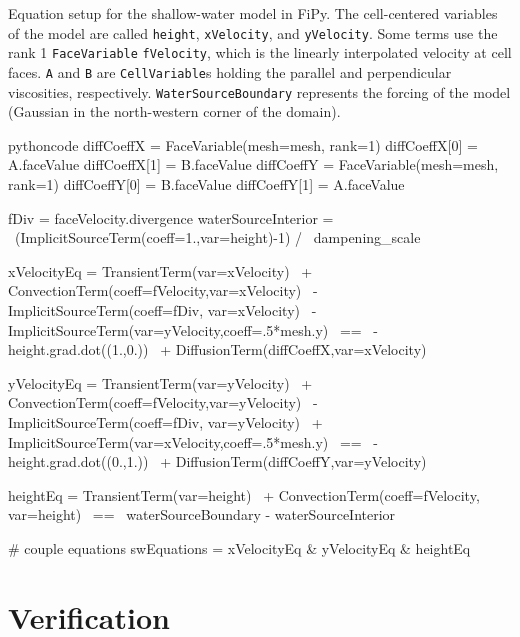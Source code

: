 \begin{listing}[p]
	\caption[Equation setup for the shallow-water model in FiPy.]{Equation setup for the shallow-water model in FiPy. The cell-centered variables of the model are called \texttt{height}, \texttt{xVelocity}, and \texttt{yVelocity}. Some terms use the rank 1 \texttt{FaceVariable} \texttt{fVelocity}, which is the linearly interpolated velocity at cell faces. \texttt{A} and \texttt{B} are \texttt{CellVariable}s holding the parallel and perpendicular viscosities, respectively. \texttt{WaterSourceBoundary} represents the forcing of the model (Gaussian in the north-western corner of the domain).}
	\label{lst:fipy-equations}
		\begin{listingsbox}{pythoncode}
			diffCoeffX = FaceVariable(mesh=mesh, rank=1)
			diffCoeffX[0] = A.faceValue
			diffCoeffX[1] = B.faceValue
			diffCoeffY = FaceVariable(mesh=mesh, rank=1)
			diffCoeffY[0] = B.faceValue
			diffCoeffY[1] = A.faceValue

			fDiv = faceVelocity.divergence
			waterSourceInterior = \
			  (ImplicitSourceTerm(coeff=1.,var=height)-1) / \
			  dampening_scale

			xVelocityEq = TransientTerm(var=xVelocity) \
			+ ConvectionTerm(coeff=fVelocity,var=xVelocity) \
			- ImplicitSourceTerm(coeff=fDiv, var=xVelocity) \
			- ImplicitSourceTerm(var=yVelocity,coeff=.5*mesh.y) \
			== \
			- height.grad.dot((1.,0.)) \
			+ DiffusionTerm(diffCoeffX,var=xVelocity)

			yVelocityEq = TransientTerm(var=yVelocity) \
			+ ConvectionTerm(coeff=fVelocity,var=yVelocity) \
			- ImplicitSourceTerm(coeff=fDiv, var=yVelocity) \
			+ ImplicitSourceTerm(var=xVelocity,coeff=.5*mesh.y) \
			== \
			- height.grad.dot((0.,1.)) \
			+ DiffusionTerm(diffCoeffY,var=yVelocity)

			heightEq = TransientTerm(var=height) \
			+ ConvectionTerm(coeff=fVelocity, var=height) \
			== \
			waterSourceBoundary - waterSourceInterior

			# couple equations
			swEquations = xVelocityEq & yVelocityEq & heightEq
		\end{listingsbox}
\end{listing}

\section{Verification}
\label{sec:appendix-sw-verification}

\subsection{\cite{killworth}}

